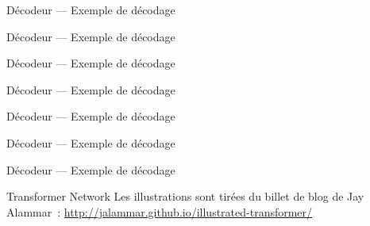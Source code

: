 \begin{frame}{Décodeur --- Exemple de décodage}
\end{frame}

\begin{frame}{Décodeur --- Exemple de décodage}
\end{frame}

\begin{frame}{Décodeur --- Exemple de décodage}
\end{frame}

\begin{frame}{Décodeur --- Exemple de décodage}
\end{frame}

\begin{frame}{Décodeur --- Exemple de décodage}
\end{frame}

\begin{frame}{Décodeur --- Exemple de décodage}
\end{frame}

\begin{frame}{Décodeur --- Exemple de décodage}
\end{frame}

\begin{frame}{Transformer Network}
  Les illustrations sont tirées du billet de blog de Jay Alammar~:
  \url{http://jalammar.github.io/illustrated-transformer/}
\end{frame}
